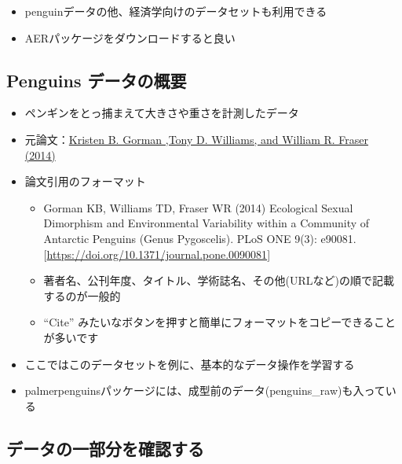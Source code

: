 \documentclass[
]{ltjsarticle}
\providecommand{\tightlist}{%
  \setlength{\itemsep}{0pt}\setlength{\parskip}{0pt}}
\begin{document}
\begin{itemize}
\tightlist
\item
  penguinデータの他、経済学向けのデータセットも利用できる
\item
  AERパッケージをダウンロードすると良い
\end{itemize}

\hypertarget{penguins-ux30c7ux30fcux30bfux306eux6982ux8981}{%
\subsection{Penguins
データの概要}\label{penguins-ux30c7ux30fcux30bfux306eux6982ux8981}}

\begin{itemize}
\tightlist
\item
  ペンギンをとっ捕まえて大きさや重さを計測したデータ
\item
  元論文：\href{https://journals.plos.org/plosone/article?id=10.1371/journal.pone.0090081}{Kristen
  B. Gorman ,Tony D. Williams, and William R. Fraser (2014)}
\item
  論文引用のフォーマット

  \begin{itemize}
  \tightlist
  \item
    Gorman KB, Williams TD, Fraser WR (2014) Ecological Sexual
    Dimorphism and Environmental Variability within a Community of
    Antarctic Penguins (Genus Pygoscelis). PLoS ONE 9(3): e90081.
    {[}\url{https://doi.org/10.1371/journal.pone.0090081}{]}
  \item
    著者名、公刊年度、タイトル、学術誌名、その他(URLなど)の順で記載するのが一般的
  \item
    ``Cite''
    みたいなボタンを押すと簡単にフォーマットをコピーできることが多いです
  \end{itemize}
\item
  ここではこのデータセットを例に、基本的なデータ操作を学習する
\item
  palmerpenguinsパッケージには、成型前のデータ(penguins\_raw)も入っている
\end{itemize}

\hypertarget{ux30c7ux30fcux30bfux306eux4e00ux90e8ux5206ux3092ux78baux8a8dux3059ux308b}{%
\subsection{データの一部分を確認する}\label{ux30c7ux30fcux30bfux306eux4e00ux90e8ux5206ux3092ux78baux8a8dux3059ux308b}}
\end{document}
